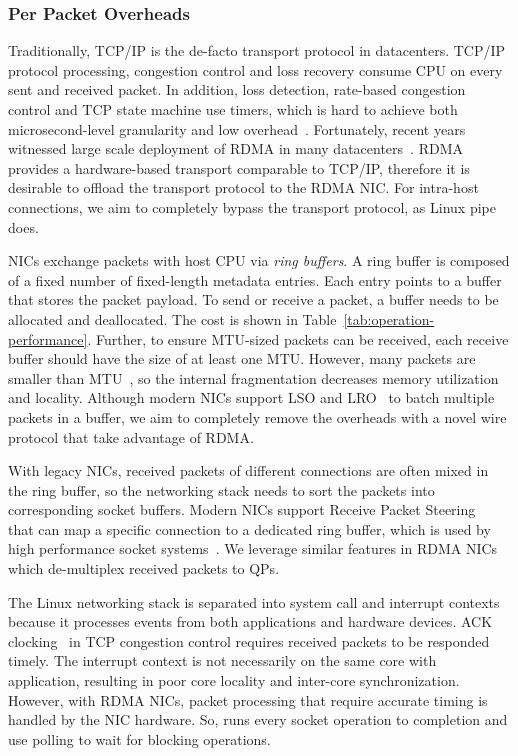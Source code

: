 \subsubsection{Per Packet Overheads}
\label{subsec:per-packet-overhead}
\quad

Traditionally, TCP/IP is the de-facto transport protocol in datacenters.
TCP/IP protocol processing, congestion control and loss recovery consume CPU on every sent and received packet.
In addition, loss detection, rate-based congestion control and TCP state machine use timers, which is hard to achieve both microsecond-level granularity and low overhead~\cite{jeong2014mtcp}.
Fortunately, recent years witnessed large scale deployment of RDMA in many datacenters~\cite{guo2016rdma,zhu2015congestion,mittal2015timely}.
RDMA provides a hardware-based transport comparable to TCP/IP, therefore it is desirable to offload the transport protocol to the RDMA NIC.
For intra-host connections, we aim to completely bypass the transport protocol, as Linux pipe does.

NICs exchange packets with host CPU via \emph{ring buffers}.
A ring buffer is composed of a fixed number of fixed-length metadata entries.
Each entry points to a buffer that stores the packet payload.
To send or receive a packet, a buffer needs to be allocated and deallocated.
The cost is shown in Table~\ref{tab:operation-performance}.
Further, to ensure MTU-sized packets can be received, each receive buffer should have the size of at least one MTU.
However, many packets are smaller than MTU~\cite{thompson1997wide}, so the internal fragmentation decreases memory utilization and locality.
Although modern NICs support LSO and LRO~\cite{lsolro} to batch multiple packets in a buffer, we aim to completely remove the overheads with a novel wire protocol that take advantage of RDMA.

With legacy NICs, received packets of different connections are often mixed in the ring buffer, so the networking stack needs to sort the packets into corresponding socket buffers.
Modern NICs support Receive Packet Steering~\cite{mellanox} that can map a specific connection to a dedicated ring buffer, which is used by high performance socket systems~\cite{jeong2014mtcp,lin2016scalable,libvma}.
We leverage similar features in RDMA NICs which de-multiplex received packets to  QPs.

The Linux networking stack is separated into system call and interrupt contexts because it processes events from both applications and hardware devices.
ACK clocking~\cite{mprdma} in TCP congestion control requires received packets to be responded timely.
The interrupt context is not necessarily on the same core with application, resulting in poor core locality and inter-core synchronization.
However, with RDMA NICs, packet processing that require accurate timing is handled by the NIC hardware.
So, \libipc{} runs every socket operation to completion and use polling to wait for blocking operations.


